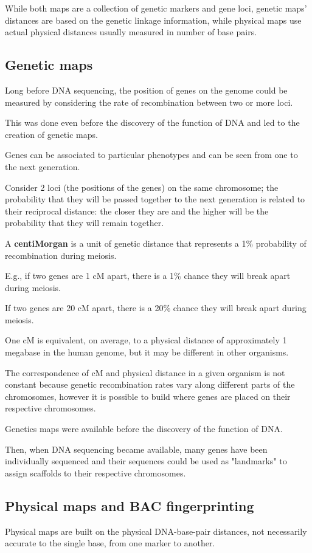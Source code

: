 While both maps are a collection of genetic markers and gene loci,
genetic maps' distances are based on the genetic linkage information, while
physical maps use actual physical distances usually measured in number
of base pairs.

\subsection{Genetic maps}

Long before DNA sequencing, the position of genes on the genome could be
measured by considering the rate of recombination between two or more loci.

This was done even before the discovery of the function of DNA and led to the
creation of genetic maps.

Genes can be associated to particular phenotypes and can be seen from one to
the next generation.

Consider 2 loci (the positions of the genes) on the same chromosome; the
probability that they will be passed together to the next generation is
related to their reciprocal distance: the closer they are and the higher will
be the probability that they will remain together.

A \textbf{centiMorgan} is a unit of genetic distance that represents a 1\%
probability of recombination during meiosis.

E.g., if two genes are 1 cM apart, there is a 1\% chance they will break apart
during meiosis.

If two genes are 20 cM apart, there is a 20\% chance they will break apart
during meiosis.

One cM is equivalent, on average, to a physical distance of approximately 1
megabase in the human genome, but it may be different in other organisms.

The correspondence of cM and physical distance in a given organism is not
constant because genetic recombination rates vary along different parts of the
chromosomes, however it is possible to build where genes are placed on their
respective chromosomes.

Genetics maps were available before the discovery of the function of DNA.

Then, when DNA sequencing became available, many genes have been individually
sequenced and their sequences could be used as "landmarks" to assign scaffolds
to their respective chromosomes.

\subsection{Physical maps and BAC fingerprinting}
Physical maps are built on the physical DNA-base-pair distances, not
necessarily accurate to the single base, from one marker to another.

